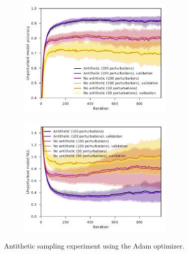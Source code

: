 \begin{figure}[tbp!]
    \begin{subfigure}[b]{0.49\textwidth}
        \centering
        \includegraphics[height=5.8cm]{graphics/E019-AS-analysis/accuracy_unp-all-series-mean-sd.pdf}
        \caption{}
        \label{fig: Theory: E019-AS-analysis/accuracy_unp-all-series-mean-sd}
    \end{subfigure}
    \hfill
    \begin{subfigure}[b]{0.49\textwidth}
        \centering
        \includegraphics[height=5.8cm]{graphics/E019-AS-analysis/return_unp-all-series-mean-sd.pdf}
        \caption{}
        \label{fig: Theory: E019-AS-analysis/return_unp-all-series-mean-sd}
    \end{subfigure}
    \vspace{-0.2cm}
    \caption{Antithetic sampling experiment using the Adam optimizer.}
    \label{fig: Theory: E019-AS-analysis}
\end{figure}
